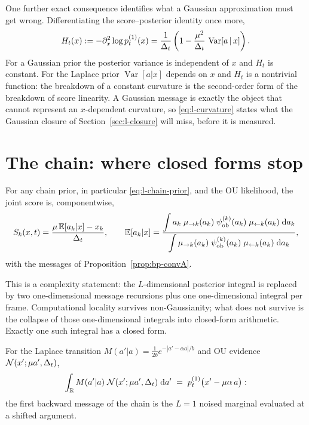 One further exact consequence identifies what a Gaussian approximation
must get wrong. Differentiating the score--posterior identity once more,
\begin{equation}
  H_t(x) := -\partial_x^2 \log p_t^{(1)}(x)
  = \frac{1}{\Delta_t}
    \left( 1 - \frac{\mu^2}{\Delta_t}\, \operatorname{Var}[a \,|\, x] \right).
  \label{eq:l-curvature}
\end{equation}
For a Gaussian prior the posterior variance is independent of $x$ and
$H_t$ is constant. For the Laplace prior $\operatorname{Var}[a|x]$ depends
on $x$ and $H_t$ is a nontrivial function: the breakdown of a constant
curvature is the second-order form of the breakdown of score linearity.
A Gaussian message is exactly the object that cannot represent an
$x$-dependent curvature, so \eqref{eq:l-curvature} states what the
Gaussian closure of Section~\ref{sec:l-closure} will miss, before it is
measured.

\section{The chain: where closed forms stop}\label{sec:l-chain}

\begin{theorem}\label{thm:l-markov-score}
For any chain prior, in particular \eqref{eq:l-chain-prior}, and the OU
likelihood, the joint score is, componentwise,
\begin{equation}
  S_k(x, t) = \frac{\mu\, \mathbb{E}[a_k | x] - x_k}{\Delta_t},
  \qquad
  \mathbb{E}[a_k | x]
  = \frac{\displaystyle\int a_k\; \mu_{\to k}(a_k)\;
      \psi^{(k)}_{\mathrm{ob}}(a_k)\;
      \mu_{\leftarrow k}(a_k)\;\mathrm{d} a_k}
     {\displaystyle\int \mu_{\to k}(a_k)\;
      \psi^{(k)}_{\mathrm{ob}}(a_k)\;
      \mu_{\leftarrow k}(a_k)\;\mathrm{d} a_k},
  \label{eq:l-markov-score}
\end{equation}
with the messages of Proposition~\ref{prop:bp-convA}.
\end{theorem}

This is a complexity statement: the $L$-dimensional posterior integral is
replaced by two one-dimensional message recursions plus one
one-dimensional integral per frame. Computational locality survives
non-Gaussianity; what does not survive is the collapse of those
one-dimensional integrals into closed-form arithmetic. Exactly one such
integral has a closed form.

\begin{proposition}\label{prop:l-onestep}
For the Laplace transition $M(a'|a) = \frac{1}{2b} e^{-|a' - \alpha a|/b}$
and OU evidence $\mathcal{N}(x'; \mu a', \Delta_t)$,
\begin{equation}
  \int_{\mathbb{R}} M(a' | a)\; \mathcal{N}(x'; \mu a', \Delta_t)\; \mathrm{d} a'
  \;=\; p_t^{(1)}\big( x' - \mu\alpha\, a \big) :
  \label{eq:l-onestep}
\end{equation}
the first backward message of the chain is the $L = 1$ noised marginal
evaluated at a shifted argument.
\end{proposition}

